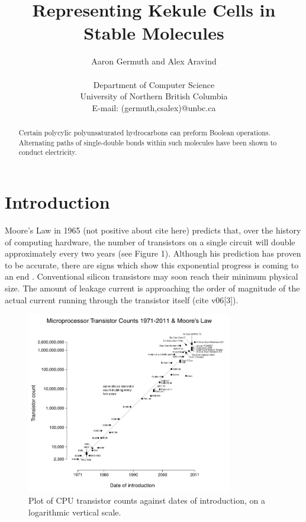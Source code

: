 \documentclass[12pt]{article}
\begin{document}
\title{Representing Kekule Cells in Stable Molecules}
\author{Aaron Germuth and Alex Aravind \\\\  
Department of Computer Science \\
University of Northern British Columbia \\
E-mail: (germuth,csalex)@unbc.ca}
\maketitle


\begin{abstract}

Certain polycylic polyunsaturated hydrocarbons can preform Boolean operations. Alternating paths of single-double bonds within such molecules have been shown to conduct electricity. 

\end{abstract}

\section{Introduction}

Moore's Law in 1965 \cite{Moore} (not positive about cite here) predicts that, over the history of computing hardware, the number of transistors on a single circuit will double approximately every two years (see Figure 1). Although his prediction has proven to be accurate, there are signs which show this exponential progress is coming to an end \cite{MooreEnd}. Conventional silicon transistors may soon reach their minimum physical size. The amount of leakage current is approaching the order of magnitude of the actual current running through the transistor itself (cite v06[3]).

\begin{figure}[ht!]
\centering
\includegraphics[width=90mm]{MooresLaw.png}
\caption{Plot of CPU transistor counts against dates of introduction, on a logarithmic vertical scale.}
\end{figure}
\end{document}
